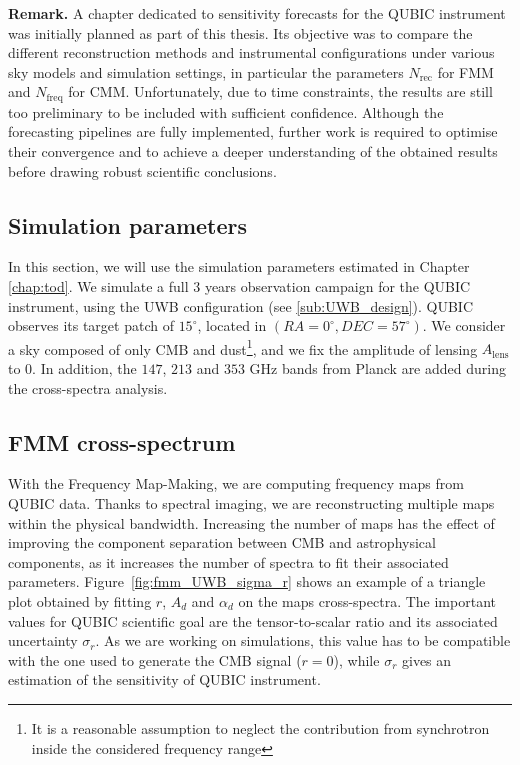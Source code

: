 \documentclass[../../thesis.tex]{subfiles}
\begin{document}
\textbf{Remark.} A chapter dedicated to sensitivity forecasts for the QUBIC instrument was initially planned as part of this thesis. Its objective was to compare the different reconstruction methods and instrumental configurations under various sky models and simulation settings, in particular the parameters $N_\text{rec}$ for FMM and $N_{\mathrm{freq}}$ for CMM. Unfortunately, due to time constraints, the results are still too preliminary to be included with sufficient confidence. Although the forecasting pipelines are fully implemented, further work is required to optimise their convergence and to achieve a deeper understanding of the obtained results before drawing robust scientific conclusions. 

\subsection{Simulation parameters}

In this section, we will use the simulation parameters estimated in Chapter \ref{chap:tod}. We simulate a full 3 years observation campaign for the QUBIC instrument, using the UWB configuration (see \ref{sub:UWB_design}). QUBIC observes its target patch of $15^\circ$, located in $(RA=0^\circ, DEC=57^\circ)$. We consider a sky composed of only CMB and dust\footnote{It is a reasonable assumption to neglect the contribution from synchrotron inside the considered frequency range}, and we fix the amplitude of lensing $A_{\mathrm{lens}}$ to $0$. In addition, the $147$, $213$ and $353$ GHz bands from Planck are added during the cross-spectra analysis. 

\subsection{FMM cross-spectrum}

With the Frequency Map-Making, we are computing frequency maps from QUBIC data. Thanks to spectral imaging, we are reconstructing multiple maps within the physical bandwidth. Increasing the number of maps has the effect of improving the component separation between CMB and astrophysical components, as it increases the number of spectra to fit their associated parameters. Figure~\ref{fig:fmm_UWB_sigma_r} shows an example of a triangle plot obtained by fitting $r$, $A_d$ and $\alpha_d$ on the maps cross-spectra. The important values for QUBIC scientific goal are the tensor-to-scalar ratio and its associated uncertainty $\sigma_r$. As we are working on simulations, this value has to be compatible with the one used to generate the CMB signal ($r=0$), while $\sigma_r$ gives an estimation of the sensitivity of QUBIC instrument. 
\end{document}
